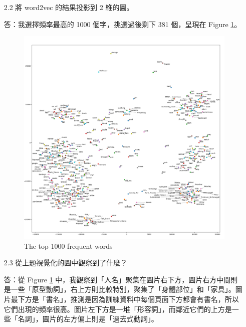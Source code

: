 \documentclass[12pt,a4paper]{extarticle}
\begin{document}
\begin{itemize}
  \item[2.2] 將 word2vec 的結果投影到 2 維的圖。
  \par 答：我選擇頻率最高的 1000 個字，挑選過後剩下 381 個，呈現在 Figure \ref{fig:wordvec-es64-top1000}。

  \begin{figure}[ht]
    \centering
    \includegraphics[width=0.8\linewidth]{images/wordvec-es64-top1000.png}
    \caption{The top 1000 frequent words}
    \label{fig:wordvec-es64-top1000}
  \end{figure}

  \item[2.3] 從上題視覺化的圖中觀察到了什麼？
  \par 答：從 Figure \ref{fig:wordvec-es64-top1000} 中，我觀察到「人名」聚集在圖片右下方，圖片右方中間則是一些「原型動詞」，右上方則比較特別，聚集了「身體部位」和「家具」。圖片最下方是「書名」，推測是因為訓練資料中每個頁面下方都會有書名，所以它們出現的頻率很高。圖片左下方是一堆「形容詞」，而鄰近它們的上方是一些「名詞」，圖片的左方偏上則是「過去式動詞」。


\end{itemize}
\end{document}
